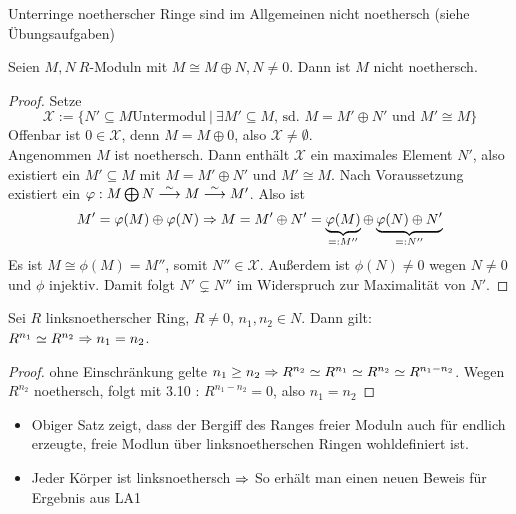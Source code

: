 \begin{anm}
	Unterringe noetherscher Ringe sind im Allgemeinen nicht noethersch (siehe Übungsaufgaben)
\end{anm}
\begin{bem}
	Seien $M,N \ R$-Moduln mit $M \cong M \oplus N, N \neq 0$. Dann ist $M$ nicht noethersch. 
\end{bem}
\begin{proof} 
	Setze $$\mathcal{X} := \{N' \subseteq M \text{Untermodul} \ | \ \exists M' \subseteq M,\, \text{sd. }  M = M' \oplus N'\text{ und } M' \cong M\}$$
	Offenbar ist $0\in \mathcal{X}$, denn $M= M \oplus 0$, also $\mathcal{X} \neq \emptyset$. \\
	Angenommen $M$ ist noethersch. Dann enthält $\mathcal{X}$ ein maximales Element $N'$, also  existiert ein $M' \subseteq M$ mit $M = M' \oplus N'$ und $M' \cong M$. Nach Voraussetzung existiert ein $\varphi : M \bigoplus N \overset{\sim}{\longrightarrow} M \overset{\sim}{\longrightarrow} M'$. Also ist 
	$$M' = \varphi(M) \oplus \varphi(N) \Rightarrow M = M' \oplus N' = \underbrace{\varphi(M)}_{=:M''} \oplus \underbrace{\varphi(N) \oplus N'}_{=:N''} $$ Es ist $M \cong \phi(M) = M''$, somit $ N'' \in \mathcal{X}$. Außerdem ist $\phi(N) \neq 0 $ wegen $ N \neq 0 $ und $\phi$ injektiv. Damit folgt $N' \subsetneq N'' $ im Widerspruch zur Maximalität von $N'$.
\end{proof}
\begin{sa}
	Sei $R$ linksnoetherscher Ring, $R \neq 0$, $n_1,n_2 \in N$. Dann gilt: $ R^{n_1} \simeq R^{n_2} \Rightarrow n_1 = n_2 $.
\end{sa}
\begin{proof}
	ohne Einschränkung gelte $n_1 \geq n_2  \Rightarrow R^{n_2} \simeq R^{n_1} \simeq R^{n_2} \simeq R^{n_1 - n_2} $. Wegen $R^{n_2}$ noethersch, folgt mit 3.10 : $R^{n_1 - n_2} =0$, also $ n_1=n_2$
\end{proof}
\begin{anm}
	\begin{itemize}
		\item Obiger Satz zeigt, dass der Bergiff des Ranges freier Moduln auch für endlich erzeugte, freie Modlun über linksnoetherschen Ringen wohldefiniert ist. 
		\item Jeder Körper ist linksnoethersch $\Rightarrow$ So erhält man einen neuen Beweis für Ergebnis aus LA1
	\end{itemize}
\end{anm}



